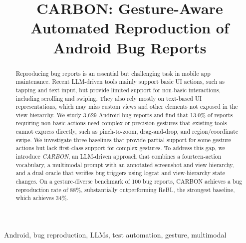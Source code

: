 \documentclass[10pt,conference,a4paper]{IEEEtran}
\newif\ifanonsubmission
\begin{document}
  \title{CARBON: Gesture-Aware Automated Reproduction of Android Bug Reports}

  \author{%
  \ifanonsubmission
    \IEEEauthorblockN{Anonymous Authors}
  \else
  \fi
  }

  \maketitle

  \begin{abstract}
  Reproducing bug reports is an essential but challenging task in mobile
  app maintenance. Recent LLM-driven tools mainly support basic UI actions,
  such as tapping and text input, but provide limited support for non-basic interactions, including scrolling and swiping. They also rely mostly on text-based UI representations, which
  may miss custom views and other elements not exposed in the view
  hierarchy. We study 3{,}629 Android bug reports and find that 13.0\% of
  reports requiring non-basic actions need complex or precision gestures
  that existing tools cannot express directly, such as pinch-to-zoom,
  drag-and-drop, and region/coordinate swipe. We investigate three baselines that provide partial support for
  some gesture actions but lack first-class support for complex gestures.
  To address this gap, we introduce \emph{CARBON}, an LLM-driven
  approach that combines a fourteen-action vocabulary, a
  multimodal prompt with an annotated screenshot and view hierarchy, and
  a dual oracle that verifies bug triggers using logcat and
  view-hierarchy state changes. On a gesture-diverse benchmark of 100 bug
  reports, CARBON achieves a bug reproduction rate of 88\%, substantially
  outperforming ReBL, the strongest baseline, which achieves 34\%.
  \end{abstract}

  \begin{IEEEkeywords}
  Android, bug reproduction, LLMs, test automation, gesture, multimodal
  \end{IEEEkeywords}
\end{document}
